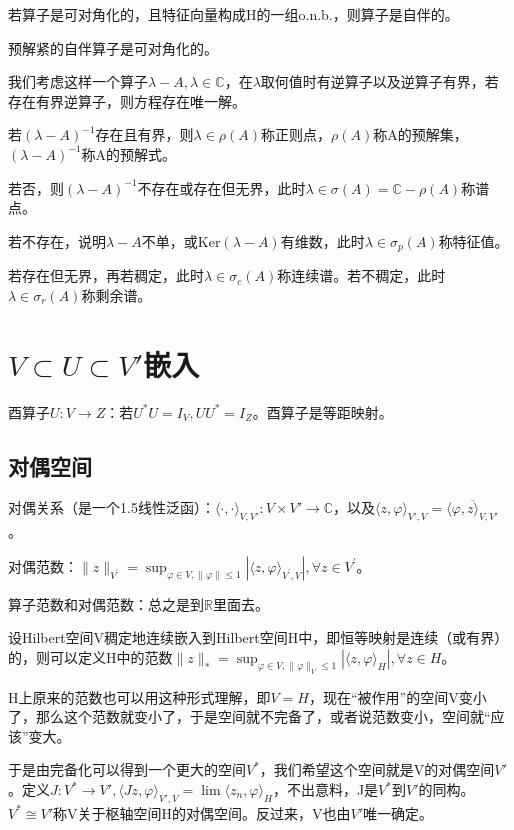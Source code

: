 若算子是可对角化的，且特征向量构成H的一组o.n.b.，则算子是自伴的。

预解紧的自伴算子是可对角化的。

我们考虑这样一个算子$\lambda - A, \lambda \in \mathbb{C}$，在$\lambda$取何值时有逆算子以及逆算子有界，若存在有界逆算子，则方程存在唯一解。

若$(\lambda - A)^{-1}$存在且有界，则$\lambda \in \rho(A)$称正则点，$\rho(A)$称A的预解集，$(\lambda - A)^{-1}$称A的预解式。

若否，则$(\lambda - A)^{-1}$不存在或存在但无界，此时$\lambda \in \sigma(A) = \mathbb{C} - \rho(A)$称谱点。

若不存在，说明$\lambda - A$不单，或Ker$(\lambda - A)$有维数，此时$\lambda \in \sigma_p(A)$称特征值。

若存在但无界，再若稠定，此时$\lambda \in \sigma_c(A)$称连续谱。若不稠定，此时$\lambda \in \sigma_r(A)$称剩余谱。

\section{\texorpdfstring{$V \subset U \subset V'$}{TEXT}嵌入}

酉算子$U: V \to Z$：若$U^{\ast}U = I_V, UU^{\ast} = I_Z$。酉算子是等距映射。

\subsection{对偶空间} 

对偶关系（是一个1.5线性泛函）：$\langle \cdot, \cdot \rangle_{V, V'}: V \times V' \to \mathbb{C}$，以及$\langle z, \varphi \rangle_{V', V} = \overline{\langle \varphi, z \rangle_{V, V'}}$。

对偶范数：$\|z\|_{V^{\prime}}=\sup _{\varphi \in V,\|\varphi\| \leq 1}\left|\langle z, \varphi\rangle_{V^{\prime}, V}\right|, \forall z \in V^{\prime}$。

算子范数和对偶范数：总之是到$\mathbb{R}$里面去。

设Hilbert空间V稠定地连续嵌入到Hilbert空间H中，即恒等映射是连续（或有界）的，则可以定义H中的范数$\|z\|_{*}=\sup_{\varphi \in V,\|\varphi\|_{V} \leq 1}\left|\langle z, \varphi\rangle_{H}\right|, \forall z \in H$。

H上原来的范数也可以用这种形式理解，即$V = H$，现在“被作用”的空间V变小了，那么这个范数就变小了，于是空间就不完备了，或者说范数变小，空间就“应该”变大。

于是由完备化可以得到一个更大的空间$V^{\ast}$，我们希望这个空间就是V的对偶空间$V'$。定义$J: V^{\ast} \to V', \langle Jz, \varphi \rangle_{V', V} = \lim \langle z_n, \varphi \rangle_H$，不出意料，J是$V^{\ast}$到$V'$的同构。$V^{\ast} \cong V'$称V关于枢轴空间H的对偶空间。反过来，V也由$V'$唯一确定。

